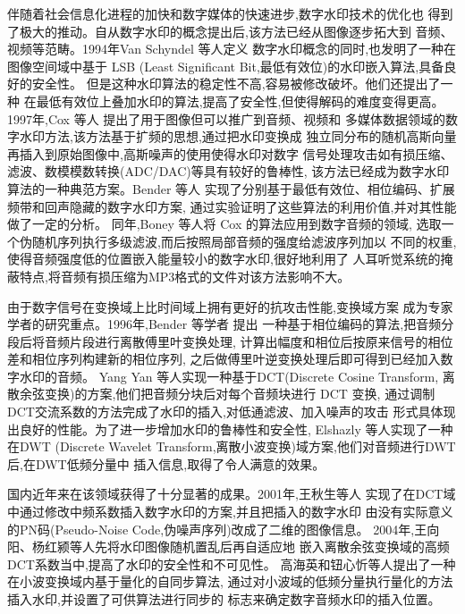 \documentclass[a4paper]{article}
\begin{document}
伴随着社会信息化进程的加快和数字媒体的快速进步,数字水印技术的优化也
得到了极大的推动。自从数字水印的概念提出后,该方法已经从图像逐步拓大到
音频、视频等范畴。1994年Van Schyndel 等人\cite{schyndel1994}定义
数字水印概念的同时,也发明了一种在图像空间域中基于
LSB (Least Significant Bit,最低有效位)的水印嵌入算法,具备良好的安全性。
但是这种水印算法的稳定性不高,容易被修改破坏。他们还提出了一种
在最低有效位上叠加水印的算法,提高了安全性,但使得解码的难度变得更高。
1997年,Cox 等人\cite{cox1997} 提出了用于图像但可以推广到音频、视频和
多媒体数据领域的数字水印方法,该方法基于扩频的思想,通过把水印变换成
独立同分布的随机高斯向量再插入到原始图像中,高斯噪声的使用使得水印对数字
信号处理攻击如有损压缩、滤波、数模模数转换(ADC/DAC)等具有较好的鲁棒性,
该方法已经成为数字水印算法的一种典范方案。Bender 等人\cite{bender1996}
实现了分别基于最低有效位、相位编码、扩展频带和回声隐藏的数字水印方案,
通过实验证明了这些算法的利用价值,并对其性能做了一定的分析。
同年,Boney 等人\cite{boney1996}将 Cox 的算法应用到数字音频的领域,
选取一个伪随机序列执行多级滤波,而后按照局部音频的强度给滤波序列加以
不同的权重,使得音频强度低的位置嵌入能量较小的数字水印,很好地利用了
人耳听觉系统的掩蔽特点,将音频有损压缩为MP3格式的文件对该方法影响不大。

由于数字信号在变换域上比时间域上拥有更好的抗攻击性能,变换域方案
成为专家学者的研究重点。1996年,Bender 等学者\cite{bender1996} 提出
一种基于相位编码的算法,把音频分段后将音频片段进行离散傅里叶变换处理,
计算出幅度和相位后按原来信号的相位差和相位序列构建新的相位序列,
之后做傅里叶逆变换处理后即可得到已经加入数字水印的音频。
Yang Yan 等人\cite{yang2009}实现一种基于DCT(Discrete Cosine Transform,
离散余弦变换)的方案,他们把音频分块后对每个音频块进行 DCT 变换,
通过调制DCT交流系数的方法完成了水印的插入,对低通滤波、加入噪声的攻击
形式具体现出良好的性能。为了进一步增加水印的鲁棒性和安全性,
Elshazly 等人\cite{elshazly2012}实现了一种在DWT (Discrete Wavelet
Transform,离散小波变换)域方案,他们对音频进行DWT后,在DWT低频分量中
插入信息,取得了令人满意的效果。

国内近年来在该领域获得了十分显著的成果。2001年,王秋生等人\cite{wang2001}
实现了在DCT域中通过修改中频系数插入数字水印的方案,并且把插入的数字水印
由没有实际意义的PN码(Pseudo-Noise Code,伪噪声序列)改成了二维的图像信息。
2004年,王向阳、杨红颍等人\cite{wang2004}先将水印图像随机置乱后再自适应地
嵌入离散余弦变换域的高频DCT系数当中,提高了水印的安全性和不可见性。
高海英和钮心忻等人\cite{gao2005}提出了一种在小波变换域内基于量化的自同步算法,
通过对小波域的低频分量执行量化的方法插入水印,并设置了可供算法进行同步的
标志来确定数字音频水印的插入位置。



\end{document}
